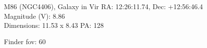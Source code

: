 \begin{block}{M86 (NGC4406), Galaxy in Vir}
    RA: 12:26:11.74, Dec: +12:56:46.4 \\ 
    Magnitude (V): 8.86 \\ 
    Dimensions: 11.53 x 8.43 PA: 128 

    Finder fov: 60 
\end{block}